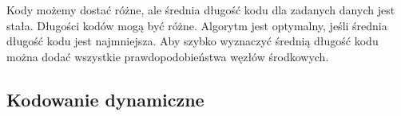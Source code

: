 \documentclass{article}
\numberwithin{equation}{subsection}
\newenvironment{definition}[1]{%
    \trivlist
    \item[\hskip\labelsep\textbf{Definition. #1.}]
    \ignorespaces
}{%
    \endtrivlist
}
\begin{document}
\begin{definition}{Kody Huffmana}
    Kody możemy dostać różne, ale średnia długość kodu dla zadanych danych jest stała. Długości kodów mogą być różne.
    Algorytm jest optymalny, jeśli średnia długość kodu jest najmniejsza. 
\end{definition}
Aby szybko wyznaczyć średnią długość kodu
można dodać wszystkie prawdopodobieństwa węzłów środkowych.
\subsection{Kodowanie dynamiczne}
\end{document}
